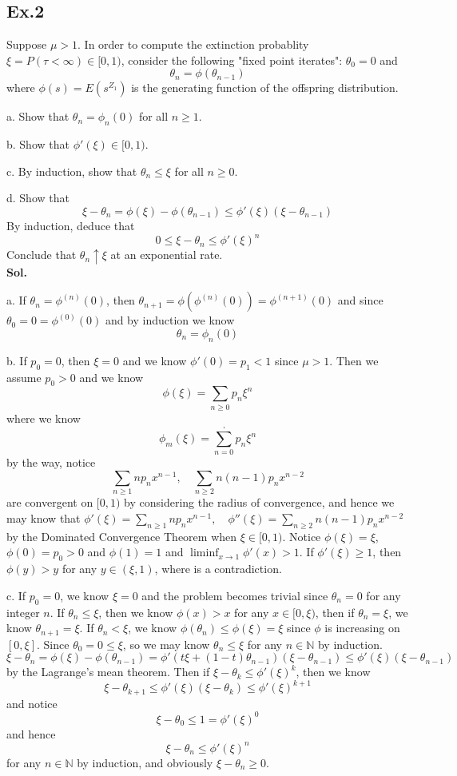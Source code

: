 \documentclass[lang=en,11pt,a4paper,citestyle =authoryear]{elegantpaper}
\newcommand{\N}{\mathbb{N}}
\begin{document}
\subsection*{Ex.2} 
Suppose $\mu > 1$. In order to compute the extinction probablity $\xi = P(\tau <\infty) \in [0,1)$, consider the following "fixed point iterates": $\theta_0 = 0$ and
\[\theta_n = \phi(\theta_{n-1})\]
where $\phi(s) = E(s^{Z_1})$ is the generating function of the offspring distribution.\par
a. Show that $\theta_n = \phi_n(0)$ for all $n\geq 1$.\par
b. Show that $\phi'(\xi) \in [0,1)$.\par
c. By induction, show that $\theta_n \leq \xi$ for all $n\geq 0$.\par
d. Show that
\[\xi - \theta_n = \phi(\xi) - \phi(\theta_{n-1}) \leq \phi'(\xi)(\xi - \theta_{n-1})\]
By induction, deduce that
\[0 \leq \xi - \theta_n \leq \phi'(\xi)^n\]
Conclude that $\theta_n\uparrow \xi$ at an exponential rate.
\vspace{0.5em}\\
\textbf{Sol.}\par
a. If $\theta_n = \phi^{(n)}(0)$, then $\theta_{n+1} = \phi(\phi^{(n)}(0)) = \phi^{(n+1)}(0)$ and since $\theta_0 = 0 = \phi^{(0)}(0)$ and by induction we know
\[\theta_n = \phi_n(0)\]\par
b.  If $p_0 = 0$, then $\xi = 0$ and we know $\phi'(0) = p_1 < 1$ since $\mu > 1$. Then we assume $p_0 > 0$ and we know
\[
\phi(\xi) = \sum\limits_{n\geq 0} p_n \xi^n
\]
where we know
\[
\phi_m(\xi) = \sum\limits_{n = 0}^, p_n\xi^n
\]
by the way, notice
\[
\sum\limits_{n\geq 1}np_nx^{n-1}, \quad\sum\limits_{n\geq 2}n(n-1)p_nx^{n-2}
\]
are convergent on $[0,1)$ by considering the radius of convergence, and hence we may know that
$\phi'(\xi) = \sum\limits_{n\geq 1}np_nx^{n-1},\quad \phi''(\xi) = \sum\limits_{n\geq 2}n(n-1)p_nx^{n-2}$
by the Dominated Convergence Theorem when $\xi\in[0,1)$. Notice $\phi(\xi) = \xi$, $\phi(0) = p_0 > 0$ and $\phi(1) = 1$ and $\liminf_{x\to 1}\phi'(x) > 1$. If $\phi'(\xi) \geq 1$, then $\phi(y) > y$ for any $y\in(\xi,1)$, where is a contradiction.\par
c. If $p_0 = 0$, we know $\xi = 0$ and the problem becomes trivial since $\theta_n = 0$ for any integer $n$. If $\theta_n \leq \xi$, then we know $\phi(x) > x$ for any $x\in [0,\xi)$, then if $\theta_n = \xi$, we know $\theta_{n+1} = \xi$. If $\theta_n < \xi$, we know $\phi(\theta_n) \leq \phi(\xi) = \xi$ since $\phi$ is increasing on $[0,\xi]$. Since $\theta_0 = 0 \leq \xi$, so we may know $\theta_n \leq \xi$ for any $n\in\N$ by induction.
\[
\xi - \theta_n = \phi(\xi)-\phi(\theta_{n-1}) = \phi'(t\xi+(1-t)\theta_{n-1})(\xi - \theta_{n-1}) \leq \phi'(\xi)(\xi - \theta_{n-1})
\]
by the Lagrange's mean theorem. Then if $\xi-\theta_{k} \leq \phi'(\xi)^k$, then we know
\[
\xi - \theta_{k+1} \leq \phi'(\xi)(\xi-\theta_{k}) \leq \phi'(\xi)^{k+1}
\]
and notice
\[
\xi - \theta_0 \leq 1 = \phi'(\xi)^0
\]
and hence
\[\xi - \theta_n \leq \phi'(\xi)^n\]
for any $n\in\N$ by induction, and obviously $\xi-\theta_n \geq 0$.
\vspace{0.5em}
\end{document}
